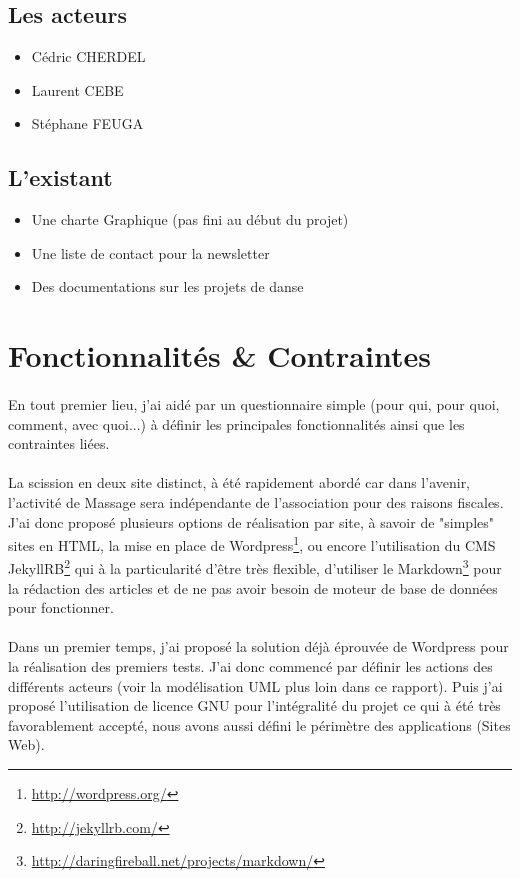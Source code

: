 \documentclass[11pt,a4paper]{report}
\begin{document}
		\subsection{Les acteurs}
			\begin{itemize}
				\item Cédric CHERDEL
				\item Laurent CEBE
				\item Stéphane FEUGA
			\end{itemize}
		\subsection{L'existant}
			\begin{itemize}
				\item Une charte Graphique (pas fini au début du projet)
				\item Une liste de contact pour la newsletter
				\item Des documentations sur les projets de danse
			\end{itemize}
	\section{Fonctionnalités \& Contraintes}
		\paragraph*{}En tout premier lieu, j'ai aidé par un questionnaire simple (pour qui, pour quoi, comment, avec quoi...) à définir les principales fonctionnalités ainsi que les contraintes liées.
		\paragraph*{}La scission en deux site distinct, à été rapidement abordé car dans l'avenir, l'activité de Massage sera indépendante de l'association pour des raisons fiscales. J'ai donc proposé plusieurs options de réalisation par site, à savoir de "simples" sites en HTML, la mise en place de Wordpress\footnote{\url{http://wordpress.org/}}, ou encore l'utilisation du CMS JekyllRB\footnote{\url{http://jekyllrb.com/}} qui à la particularité d'être très flexible, d'utiliser le Markdown\footnote{\url{http://daringfireball.net/projects/markdown/}} pour la rédaction des articles et de ne pas avoir besoin de moteur de base de données pour fonctionner.
		\paragraph*{}Dans un premier temps, j'ai proposé la solution déjà éprouvée de Wordpress pour la réalisation des premiers tests. J'ai donc commencé par définir les actions des différents acteurs (voir la modélisation UML plus loin dans ce rapport). Puis j'ai proposé l'utilisation de licence GNU pour l'intégralité du projet ce qui à été très favorablement accepté, nous avons aussi défini le périmètre des applications (Sites Web).
\end{document}
